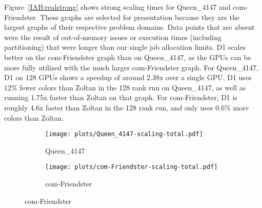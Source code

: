 Figure~\ref{IAB:realstrong} shows strong scaling times for Queen\_4147 and com-Friendster.
These graphs are selected for presentation because they are the largest graphs of their respective problem domains.
Data points that are absent were the result of out-of-memory issues or execution times (including partitioning) 
that were longer than our single job allocation limits.
D1 scales better on the com-Friendster graph than on Queen\_4147, as 
the GPUs can be more fully utilized with the much larger com-Friendster graph. 
For Queen\_4147, D1 on 128 GPUs shows a speedup of around 2.38x over a single GPU.
D1 uses 12\% fewer colors than Zoltan in the 128 rank run on Queen\_4147, as well as running 1.75x faster than Zoltan on that graph.
For com-Friendster, D1 is roughly 4.6x faster than Zoltan in the 128 rank run, and only uses 0.6\% more colors than Zoltan.

\begin{figure}[h]
  \centering
  \caption{Zoltan and D1 strong scaling on select (a) PDE and (b) Social Network graphs.}
  \label{IAB:realstrong}
  \begin{subfigure}[b]{0.25\textwidth}
    \centering
    \texttt{[image: plots/Queen\_4147-scaling-total.pdf]}
    \caption{Queen\_4147}
    \label{IAB:queenhybridzoltan}
  \end{subfigure}%
  \begin{subfigure}[b]{0.22\textwidth}
    \centering
    \texttt{[image: plots/com-Friendster-scaling-total.pdf]}
    \caption{com-Friendster}
    \label{IAB:friendsterhybridzoltan}
  \end{subfigure}
\end{figure}

